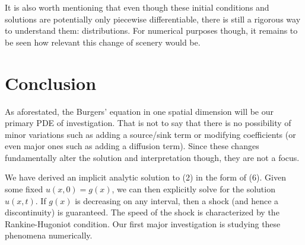 \documentclass{myproject}
\begin{document}
It is also worth mentioning that even though these initial conditions and solutions are potentially only piecewise differentiable, there is still a rigorous way to understand them: distributions. For numerical purposes though, it remains to be seen how relevant this change of scenery would be.

\section{Conclusion}

As aforestated, the Burgers' equation in one spatial dimension will be our primary PDE of investigation. That is not to say that there is no possibility of minor variations such as adding a source/sink term or modifying coefficients (or even major ones such as adding a diffusion term). Since these changes fundamentally alter the solution and interpretation though, they are not a focus. 

We have derived an implicit analytic solution to (2) in the form of (6). Given some fixed $u(x,0) = g(x)$, we can then explicitly solve for the solution $u(x,t)$. If $g(x)$ is decreasing on any interval, then a shock (and hence a discontinuity) is guaranteed. The speed of the shock is characterized by the Rankine-Hugoniot condition. Our first major investigation is studying these phenomena numerically.

\nocite{choksi2022}
\nocite{iserles2009}
\nocite{kutz2013}
\nocite{trefethen2001}
\nocite{learncfd}
\nocite{evans2010}
\printbibliography
\end{document}
